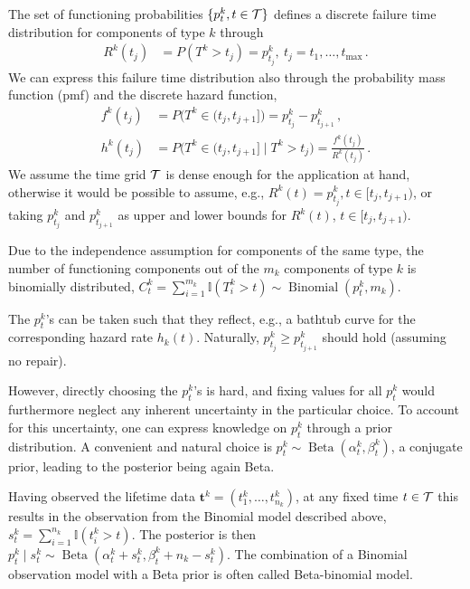 \documentclass[authoryear, 12pt, a4paper]{elsarticle}
\newcommand{\bs}[1]{\boldsymbol{#1}}
\renewcommand{\vec}[1]{{\bs#1}}
\newcommand{\indic}{\mathbb{I}}
\newcommand{\bin}{\operatorname{Binomial}}
\newcommand{\be}{\operatorname{Beta}}
\def\tmax{t_\text{max}}
\newcommand{\td}[1]{%
  \iftoggle{td}{%
    \todo[inline]{#1}%
  }{}%
}
\begin{document}
The set of functioning probabilities $\{ p^k_t, t \in {\cal T}\}$
defines a discrete failure time distribution for components of type $k$ through
\begin{align*}
R^k(t_j) &= P(T^k > t_j) = p^k_{t_j},\ t_j = t_1, \ldots, \tmax\,.
\end{align*}
We can express this failure time distribution also through the probability mass function (pmf) and the discrete hazard function,
\begin{align*}
f^k(t_j) &= P\big(T^k \in (t_j,t_{j+1}]\big) = p^k_{t_j} - p^k_{t_{j+1}}\,,\\ 
h^k(t_j) &= P\big(T^k \in (t_j,t_{j+1}]\mid T^k > t_j\big) = \frac{f^k(t_j)}{R^k(t_j)}\,. %
\end{align*}
We assume the time grid $\cal T$ is dense enough for the application at hand,
otherwise it would be possible to assume, e.g.,
$R^k(t) = p^k_{t_j}, t \in [t_j, t_{j+1})$,
or taking $p^k_{t_j}$ and $p^k_{t_{j+1}}$ as upper and lower bounds for $R^k(t)$, $t \in [t_j, t_{j+1})$.

\td{***illustrate discrete distribution with a graph of R, q, h?***}

Due to the independence assumption for components of the same type, 
the number of functioning components out of the $m_k$ components of type $k$
is binomially distributed, $C^k_t = \sum_{i=1}^{m_k} \indic(T^k_i > t) \sim \bin(p^k_t, m_k)$.

The $p^k_t$'s can be taken such that they reflect, e.g., a bathtub curve for the corresponding hazard rate $h_k(t)$.
Naturally, $p^k_{t_j} \ge p^k_{t_{j+1}}$ should hold (assuming no repair).

However, directly choosing the $p^k_t$'s is hard,
and fixing values for all $p^k_t$ would furthermore neglect any inherent uncertainty in the particular choice.  
To account for this uncertainty, one can express knowledge on $p^k_t$ through a prior distribution.
A convenient and natural choice is $p^k_t \sim \be(\alpha^k_t, \beta^k_t)$, a conjugate prior,
leading to the posterior being again Beta.

Having observed the lifetime data $\vec{t}^k = (t^k_1, \ldots, t^k_{n_k})$,
at any fixed time $t \in {\cal T}$ this results in the observation from the Binomial model described above,
$s^k_t = \sum_{i=1}^{n_k} \indic(t^k_i > t)$.
The posterior is then $p^k_t \mid s^k_t \sim \be(\alpha^k_t + s^k_t, \beta^k_t + n_k - s^k_t)$.
The combination of a Binomial observation model with a Beta prior is often called Beta-binomial model.
\end{document}
